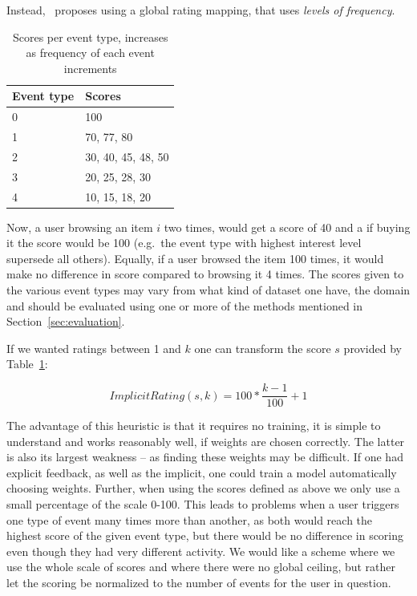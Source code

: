 Instead,~\cite{pkghost2014implicit} proposes using a global rating mapping,
that uses \textit{levels of frequency}.

\begin{table}[H]
  \centering
  \begin{tabular}{ll}
  \toprule
  Event type & Scores \\ \midrule
  0 & 100 \\
  1 & 70, 77, 80 \\
  2 & 30, 40, 45, 48, 50 \\
  3 & 20, 25, 28, 30 \\
  4 & 10, 15, 18, 20 \\
  \bottomrule
  \end{tabular}
  \caption{Scores per event type, increases as frequency of each event
           increments}
\label{implicit-table}
\end{table}

Now, a user browsing an item $i$ two times, would get a score of 40 and a if
buying it the score would be 100 (e.g.\ the event type with highest interest
level supersede all others). Equally, if a user browsed the item 100 times, it
would make no difference in score compared to browsing it 4 times. The scores
given to the various event types may vary from what kind of dataset one have,
the domain and should be evaluated using one or more of the methods mentioned
in Section~\ref{sec:evaluation}.

If we wanted ratings between 1 and $k$ one can transform the score $s$ provided
by Table~\ref{implicit-table}:

\begin{equation}
  ImplicitRating(s, k) = 100 * \frac{k-1}{100} + 1
\end{equation}

The advantage of this heuristic is that it requires no training, it is simple
to understand and works reasonably well, if weights are chosen correctly.
The latter is also its largest weakness -- as finding these weights may be
difficult. If one had explicit feedback, as well as the implicit, one could
train a model automatically choosing weights. Further, when using the scores
defined as above we only use a small percentage of the scale 0-100. This leads
to problems when a user triggers one type of event many times more than
another, as both would reach the highest score of the given event type, but
there would be no difference in scoring even though they had very different
activity. We would like a scheme where we use the whole scale of scores and
where there were no global ceiling, but rather let the scoring be normalized to
the number of events for the user in question.

